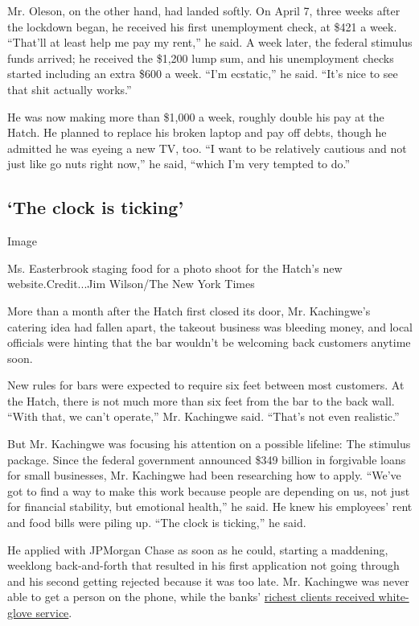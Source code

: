 Mr. Oleson, on the other hand, had landed softly. On April 7, three
weeks after the lockdown began, he received his first unemployment
check, at \$421 a week. ``That'll at least help me pay my rent,'' he
said. A week later, the federal stimulus funds arrived; he received the
\$1,200 lump sum, and his unemployment checks started including an extra
\$600 a week. ``I'm ecstatic,'' he said. ``It's nice to see that shit
actually works.''

He was now making more than \$1,000 a week, roughly double his pay at
the Hatch. He planned to replace his broken laptop and pay off debts,
though he admitted he was eyeing a new TV, too. ``I want to be
relatively cautious and not just like go nuts right now,'' he said,
``which I'm very tempted to do.''

\hypertarget{the-clock-is-ticking}{%
\subsection{`The clock is ticking'}\label{the-clock-is-ticking}}

Image

Ms. Easterbrook staging food for a photo shoot for the Hatch's new
website.Credit...Jim Wilson/The New York Times

More than a month after the Hatch first closed its door, Mr. Kachingwe's
catering idea had fallen apart, the takeout business was bleeding money,
and local officials were hinting that the bar wouldn't be welcoming back
customers anytime soon.

New rules for bars were expected to require six feet between most
customers. At the Hatch, there is not much more than six feet from the
bar to the back wall. ``With that, we can't operate,'' Mr. Kachingwe
said. ``That's not even realistic.''

But Mr. Kachingwe was focusing his attention on a possible lifeline: The
stimulus package. Since the federal government announced \$349 billion
in forgivable loans for small businesses, Mr. Kachingwe had been
researching how to apply. ``We've got to find a way to make this work
because people are depending on us, not just for financial stability,
but emotional health,'' he said. He knew his employees' rent and food
bills were piling up. ``The clock is ticking,'' he said.

He applied with JPMorgan Chase as soon as he could, starting a
maddening, weeklong back-and-forth that resulted in his first
application not going through and his second getting rejected because it
was too late. Mr. Kachingwe was never able to get a person on the phone,
while the banks'
\href{https://www.nytimes3xbfgragh.onion/2020/04/22/business/sba-loans-ppp-coronavirus.html}{richest
clients received white-glove service}.

